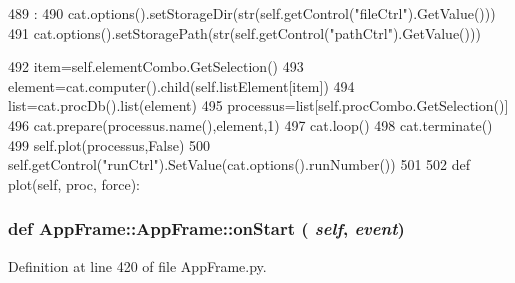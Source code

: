 \begin{DoxyCode}
489                              :
490         cat.options().setStorageDir(str(self.getControl("fileCtrl").GetValue()))
491         cat.options().setStoragePath(str(self.getControl("pathCtrl").GetValue()))
      
492         item=self.elementCombo.GetSelection()
493         element=cat.computer().child(self.listElement[item])
494         list=cat.procDb().list(element)
495         processus=list[self.procCombo.GetSelection()]
496         cat.prepare(processus.name(),element,1)
497         cat.loop()
498         cat.terminate()
499         self.plot(processus,False)
500         self.getControl("runCtrl").SetValue(cat.options().runNumber())
501 
502 
    def plot(self, proc, force):
\end{DoxyCode}
\hypertarget{classAppFrame_1_1AppFrame_a49804b67199c453697ac5a4bcecc920e}{
\subsubsection[{onStart}]{\setlength{\rightskip}{0pt plus 5cm}def AppFrame::AppFrame::onStart ( {\em self}, \/   {\em event})}}
\label{classAppFrame_1_1AppFrame_a49804b67199c453697ac5a4bcecc920e}


Definition at line 420 of file AppFrame.py.


